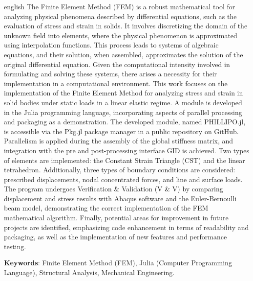 

\begin{resumo}[Abstract]
 \begin{otherlanguage*}{english}
  The Finite Element Method (FEM) is a robust mathematical tool for analyzing physical phenomena described by differential equations, such as the evaluation of stress and strain in solids. It involves discretizing the domain of the unknown field into elements, where the physical phenomenon is approximated using interpolation functions. This process leads to systems of algebraic equations, and their solution, when assembled, approximates the solution of the original differential equation. Given the computational intensity involved in formulating and solving these systems, there arises a necessity for their implementation in a computational environment. This work focuses on the implementation of the Finite Element Method for analyzing stress and strain in solid bodies under static loads in a linear elastic regime. A module is developed in the Julia programming language, incorporating aspects of parallel processing and packaging as a demonstration. The developed module, named PHILLIPO.jl, is accessible via the Pkg.jl package manager in a public repository on GitHub. Parallelism is applied during the assembly of the global stiffness matrix, and integration with the pre and post-processing interface GID is achieved. Two types of elements are implemented: the Constant Strain Triangle (CST) and the linear tetrahedron. Additionally, three types of boundary conditions are considered: prescribed displacements, nodal concentrated forces, and line and surface loads. The program undergoes Verification \& Validation (V \& V) by comparing displacement and stress results with Abaqus software and the Euler-Bernoulli beam model, demonstrating the correct implementation of the FEM mathematical algorithm. Finally, potential areas for improvement in future projects are identified, emphasizing code enhancement in terms of readability and packaging, as well as the implementation of new features and performance testing.
  
  \textbf{Keywords}: Finite Element Method (FEM), Julia (Computer Programming Language), Structural Analysis, Mechanical Engineering.
 \end{otherlanguage*}
\end{resumo}
